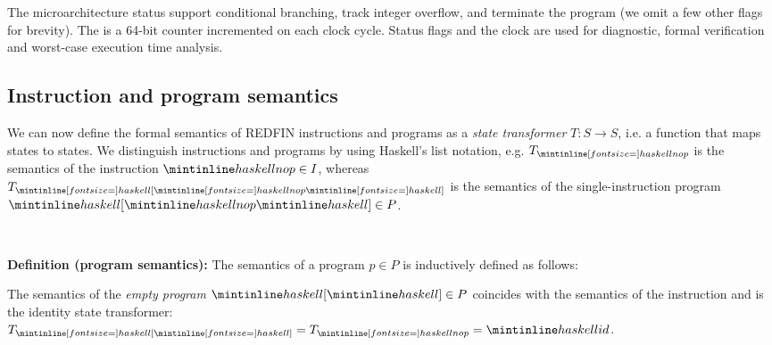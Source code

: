 The microarchitecture status  support conditional branching, track
integer overflow, and terminate the program (we omit a few other flags for
brevity).
The  is a 64-bit counter
incremented on each clock cycle. Status flags and the clock are used for
diagnostic, formal verification and worst-case execution time analysis.

\subsection{Instruction and program semantics}

We can now define the formal semantics of REDFIN instructions and programs as a
\emph{state transformer} $T : S \rightarrow S$, i.e. a function that maps
states to states. We distinguish instructions and programs by using
Haskell's list notation, e.g. $T_{\subhs{nop}}$ is the semantics of the
instruction $\hs{nop} \in I$, whereas $T_{\subhs{[}\subhs{nop}\subhs{]}}$ is the
semantics of the single-instruction program $\hs{[}\hs{nop}\hs{]} \in P$.


\vspace{-3mm}
\noindent\hrulefill~\\
\vspace{-4.5mm}

\noindent
\textbf{Definition (program semantics):} The semantics of a program $p \in P$
is inductively defined as follows:

    The semantics of the \emph{empty program} $\hs{[}\hs{]} \in P$ coincides with
    the semantics of the instruction  and is the identity state transformer:
    $T_{\subhs{[}\subhs{]}} = T_{\subhs{nop}} = \hs{id}$.

